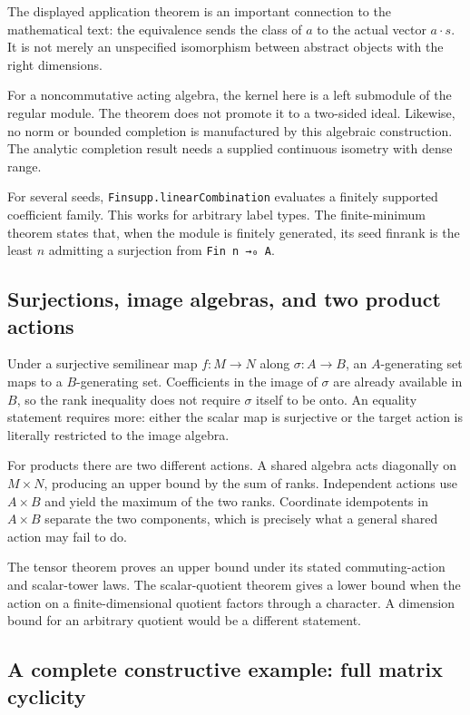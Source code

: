 \documentclass[11pt,a4paper]{article}
\newcommand{\code}[1]{\nolinkurl{#1}}
\begin{document}
The displayed application theorem is an important connection to the mathematical text: the equivalence sends the class of $a$ to the actual vector $a\cdot s$. It is not merely an unspecified isomorphism between abstract objects with the right dimensions.

For a noncommutative acting algebra, the kernel here is a left submodule of the regular module. The theorem does not promote it to a two-sided ideal. Likewise, no norm or bounded completion is manufactured by this algebraic construction. The analytic completion result needs a supplied continuous isometry with dense range.

For several seeds, \code{Finsupp.linearCombination} evaluates a finitely supported coefficient family. This works for arbitrary label types. The finite-minimum theorem states that, when the module is finitely generated, its seed finrank is the least $n$ admitting a surjection from \code{Fin n →₀ A}.

\subsection{Surjections, image algebras, and two product actions}

Under a surjective semilinear map $f:M\to N$ along $\sigma:A\to B$, an $A$-generating set maps to a $B$-generating set. Coefficients in the image of $\sigma$ are already available in $B$, so the rank inequality does not require $\sigma$ itself to be onto. An equality statement requires more: either the scalar map is surjective or the target action is literally restricted to the image algebra.

For products there are two different actions. A shared algebra acts diagonally on $M\times N$, producing an upper bound by the sum of ranks. Independent actions use $A\times B$ and yield the maximum of the two ranks. Coordinate idempotents in $A\times B$ separate the two components, which is precisely what a general shared action may fail to do.

The tensor theorem proves an upper bound under its stated commuting-action and scalar-tower laws. The scalar-quotient theorem gives a lower bound when the action on a finite-dimensional quotient factors through a character. A dimension bound for an arbitrary quotient would be a different statement.

\subsection{A complete constructive example: full matrix cyclicity}
\end{document}
